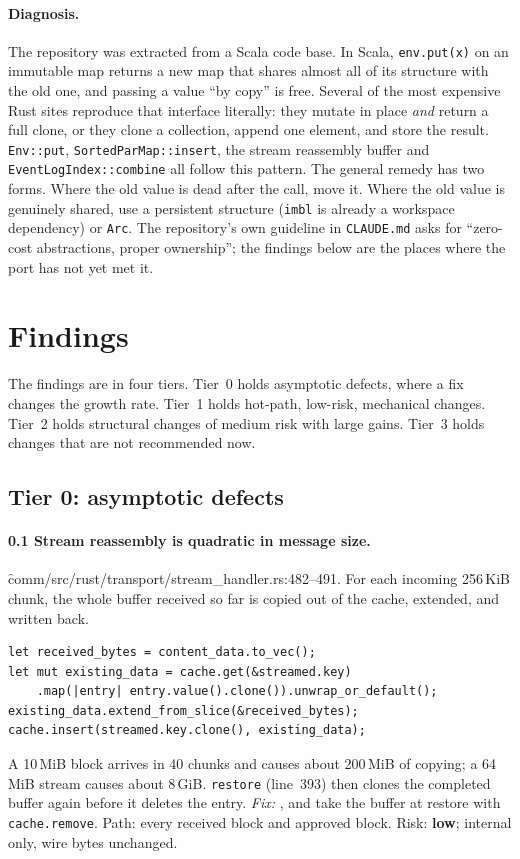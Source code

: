 \documentclass[11pt]{article}
\newcommand{\low}{\textcolor{lo}{\textbf{low}}}
\begin{document}
\paragraph{Diagnosis.} The repository was extracted from a Scala code base. In Scala,
\texttt{env.put(x)} on an immutable map returns a new map that shares almost all of its
structure with the old one, and passing a value ``by copy'' is free. Several of the most
expensive Rust sites reproduce that interface literally: they mutate in place \emph{and} return
a full clone, or they clone a collection, append one element, and store the result.
\texttt{Env::put}, \texttt{SortedParMap::insert}, the stream reassembly buffer and
\texttt{EventLogIndex::combine} all follow this pattern. The general remedy has two forms.
Where the old value is dead after the call, move it. Where the old value is genuinely shared,
use a persistent structure (\texttt{imbl} is already a workspace dependency) or \texttt{Arc}.
The repository's own guideline in \texttt{CLAUDE.md} asks for ``zero-cost abstractions, proper
ownership''; the findings below are the places where the port has not yet met it.

\section{Findings}

The findings are in four tiers. Tier~0 holds asymptotic defects, where a fix changes the growth
rate. Tier~1 holds hot-path, low-risk, mechanical changes. Tier~2 holds structural changes of
medium risk with large gains. Tier~3 holds changes that are not recommended now.

\subsection{Tier 0: asymptotic defects}

\paragraph{0.1 Stream reassembly is quadratic in message size.}
\f{comm/src/rust/transport/stream_handler.rs}:482--491. For each incoming 256\,KiB chunk, the
whole buffer received so far is copied out of the cache, extended, and written back.
\begin{lstlisting}
let received_bytes = content_data.to_vec();
let mut existing_data = cache.get(&streamed.key)
    .map(|entry| entry.value().clone()).unwrap_or_default();
existing_data.extend_from_slice(&received_bytes);
cache.insert(streamed.key.clone(), existing_data);
\end{lstlisting}
A 10\,MiB block arrives in 40 chunks and causes about 200\,MiB of copying; a 64\,MiB stream
causes about 8\,GiB. \texttt{restore} (line~393) then clones the completed buffer again before it
deletes the entry. \emph{Fix:}
, and take the buffer at
restore with \texttt{cache.remove}. Path: every received block and approved block.
Risk: \low{}; internal only, wire bytes unchanged.
\end{document}
